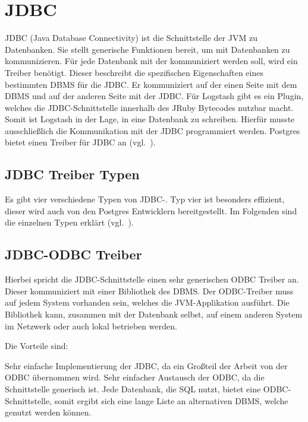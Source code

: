 \section{JDBC}
\gls{JDBC} (Java Database Connectivity) ist die Schnittstelle der \gls{JVM} zu
Datenbanken. Sie stellt generische Funktionen bereit, um mit Datenbanken zu
kommunizieren. Für jede Datenbank mit der kommuniziert werden soll, wird ein
\gls{Treiber} benötigt. Dieser beschreibt die spezifischen Eigenschaften eines
bestimmten \gls{DBMS} für die \gls{JDBC}\@. Er kommuniziert auf der einen Seite
mit dem \gls{DBMS} und auf der anderen Seite mit der \gls{JDBC}\@. Für Logstash
gibt es ein Plugin, welches die \gls{JDBC}\hyp{}Schnittstelle innerhalb des
JRuby Bytecodes nutzbar macht. Somit ist Logstash in der Lage, in eine Datenbank
zu schreiben. Hierfür musste ausschließlich die Kommunikation mit der
\gls{JDBC} programmiert werden. Postgres bietet einen \gls{Treiber} für
\gls{JDBC} an (vgl.~\cite{postgres-jdbc}).
\tm%

\subsection{JDBC Treiber Typen}
Es gibt vier verschiedene Typen von \gls{JDBC}\hyp{}.
Typ vier ist besonders effizient, dieser wird auch von den Postgres Entwicklern
bereitgestellt. Im Folgenden sind die einzelnen Typen erklärt
(vgl.~\cite{jdbc-types}).
\tm%

\subsection{JDBC-ODBC Treiber}
Hierbei spricht die \gls{JDBC}\hyp{}Schnittstelle einen sehr generischen
\gls{ODBC} \gls{Treiber} an. Dieser kommuniziert mit einer Bibliothek des
\gls{DBMS}\@. Der \gls{ODBC}\hyp{}\gls{Treiber} muss auf jedem System vorhanden
sein, welches die \gls{JVM}\hyp{}Applikation ausführt. Die Bibliothek kann,
zusammen mit der Datenbank selbst, auf einem anderen System im Netzwerk oder
auch lokal betrieben werden.

Die Vorteile sind:

\begin{outline}
  \1 Sehr einfache Implementierung der \gls{JDBC}, da ein Großteil der Arbeit
  von der \gls{ODBC} übernommen wird.
  \1 Sehr einfacher Austausch der \gls{ODBC}, da die Schnittstelle generisch
  ist.
  \1 Jede Datenbank, die \gls{SQL} nutzt, bietet eine
  \gls{ODBC}\hyp{}Schnittstelle, somit ergibt sich eine lange Liste an
  alternativen \gls{DBMS}, welche genutzt werden können.
\end{outline}

